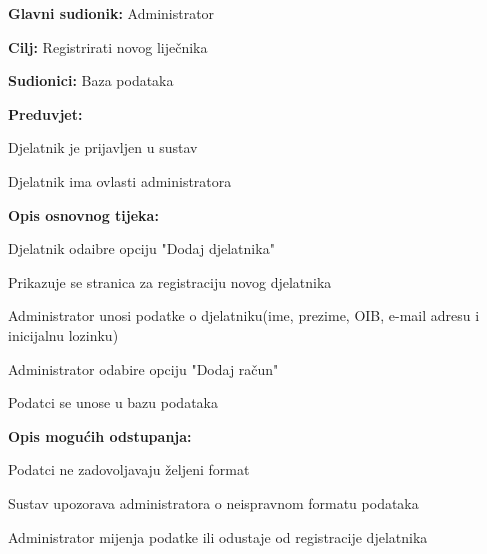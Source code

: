 					
				
				\noindent {}
				\begin{packed_item}
					
					\item \textbf{Glavni sudionik: }Administrator
					\item  \textbf{Cilj: }Registrirati novog liječnika
					\item  \textbf{Sudionici: }Baza podataka
					\item  \textbf{Preduvjet: }
					\item[] \begin{packed_enum}
						
						\item[-] Djelatnik je prijavljen u sustav
						\item[-] Djelatnik ima ovlasti administratora
					\end{packed_enum}
					\item  \textbf{Opis osnovnog tijeka: }
					
					\item[] \begin{packed_enum}
						\item Djelatnik odaibre opciju "Dodaj djelatnika"
						\item Prikazuje se stranica za registraciju novog djelatnika
						\item Administrator unosi podatke o djelatniku(ime, prezime, OIB, e-mail adresu i inicijalnu lozinku)
						\item Administrator odabire opciju "Dodaj račun"
						\item Podatci se unose u bazu podataka
					\end{packed_enum}
					
					\item  \textbf{Opis mogućih odstupanja:}
					
					\item[] \begin{packed_item}
						
						\item[3.a] Podatci ne zadovoljavaju željeni format
						\item[] \begin{packed_enum}
							\item Sustav upozorava administratora o neispravnom formatu podataka
							\item Administrator mijenja podatke ili odustaje od registracije djelatnika							
						\end{packed_enum}
					\end{packed_item}
				\end{packed_item}
				
